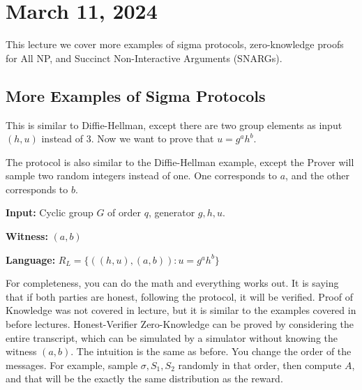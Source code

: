 \section{March 11, 2024}
\label{20240311}

This lecture we cover more examples of sigma protocols, zero-knowledge proofs for All NP, and Succinct Non-Interactive Arguments (SNARGs).

\subsection{More Examples of Sigma Protocols}

\begin{example}

This is similar to Diffie-Hellman, except there are two group elements as input $(h, u)$ instead of 3. Now we want to prove that $u = g^a h^b$.

The protocol is also similar to the Diffie-Hellman example, except the Prover will sample two random integers instead of one. One corresponds to $a$, and the other corresponds to $b$.

\textbf{Input:} Cyclic group $G$ of order $q$, generator $g, h, u$.

\textbf{Witness:} $(a, b)$

\textbf{Language:} $R_{L} = \{ ((h, u), (a, b)): u = g^a h^b\}$


For completeness, you can do the math and everything works out. It is saying that if both parties are honest, following the protocol, it will be verified. Proof of Knowledge was not covered in lecture, but it is similar to the examples covered in before lectures. Honest-Verifier Zero-Knowledge can be proved by considering the entire transcript, which can be simulated by a simulator without knowing the witness $(a, b)$. The intuition is the same as before. You change the order of the messages. For example, sample $\sigma, S_1, S_2$ randomly in that order, then compute $A$, and that will be the exactly the same distribution as the reward.

\end{example}


